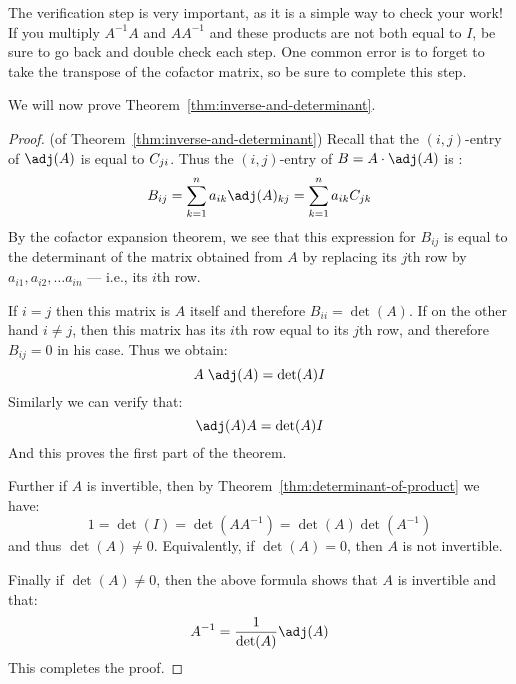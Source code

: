 The verification step is very important, as it is a simple way to
check your work! If you multiply $A^{-1}A$ and $AA^{-1}$ and these
products are not both equal to $I$, be sure to go back and double
check each step.  One common error is to forget to take the transpose
of the cofactor matrix, so be sure to complete this step.

We will now prove Theorem~\ref{thm:inverse-and-determinant}.

\begin{proof} (of Theorem~\ref{thm:inverse-and-determinant}) Recall
  that the $(i,j)$-entry of $\adj(A)$ is equal to $\cof{A}{ji}$.
  Thus the $(i,j)$-entry of $B=A\cdot \adj(A)$ is :
  \begin{equation*}
    B_{ij}=\sum_{k=1}^n a_{ik} \adj (A)_{kj}= \sum_{k=1}^n a_{ik} \cof{A}{jk}
  \end{equation*}
  By the cofactor expansion theorem, we see that this expression for
  $B_{ij}$ is equal to the determinant of the matrix obtained from $A$
  by replacing its $j$th row by $a_{i1}, a_{i2}, \dots a_{in}$ ---
  i.e., its $i$th row.

  If $i=j$ then this matrix is $A$ itself and therefore
  $B_{ii}=\det(A)$. If on the other hand $i\neq j$, then this matrix
  has its $i$th row equal to its $j$th row, and therefore $B_{ij}=0$
  in his case. Thus we obtain:
  \begin{equation*}
    A \; \adj(A) = {\det(A)} I
  \end{equation*}
  Similarly we can verify that:
  \begin{equation*}
    \adj(A)A = {\det(A)} I
  \end{equation*}
  And this proves the first part of the theorem. 

  Further if $A$ is invertible, then by
  Theorem~\ref{thm:determinant-of-product} we have:
  \begin{equation*}
    1 = \det(I) = \det(A A^{-1}) = \det(A) \det(A^{-1})
  \end{equation*}
  and thus $\det(A) \neq 0$. Equivalently, if $\det(A) = 0$, then
  $A$ is not invertible.

  Finally if $\det(A) \neq 0$, then the above formula shows that $A$
  is invertible and that:
  \begin{equation*}
    A^{-1} = \frac{1}{\det(A)} \adj(A)
  \end{equation*}
  This completes the proof.
\end{proof}


